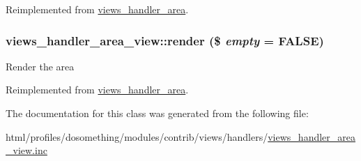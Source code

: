 Reimplemented from \hyperlink{classviews__handler__area_af3615e22fccc744485ddb7978ce812ff}{views\_\-handler\_\-area}.\hypertarget{classviews__handler__area__view_a475224309a7f09c2101477edf73541e5}{
\subsubsection[{render}]{\setlength{\rightskip}{0pt plus 5cm}views\_\-handler\_\-area\_\-view::render (\$ {\em empty} = {\ttfamily FALSE})}}
\label{classviews__handler__area__view_a475224309a7f09c2101477edf73541e5}
Render the area 

Reimplemented from \hyperlink{classviews__handler__area_a9f3eb4b8ee98a0929946e8de7253d302}{views\_\-handler\_\-area}.

The documentation for this class was generated from the following file:\begin{DoxyCompactItemize}
\item 
html/profiles/dosomething/modules/contrib/views/handlers/\hyperlink{views__handler__area__view_8inc}{views\_\-handler\_\-area\_\-view.inc}\end{DoxyCompactItemize}
